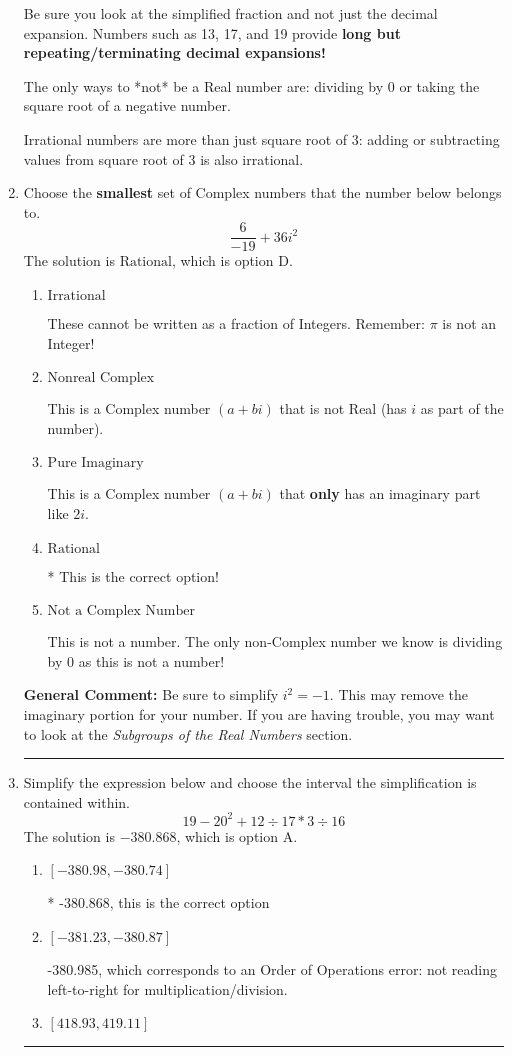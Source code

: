 \documentclass{extbook}[14pt]
\newcommand{\litem}[1]{\item #1

\rule{\textwidth}{0.4pt}}
\begin{document}
\begin{enumerate}
{ Be sure you look at the simplified fraction and not just the decimal expansion. Numbers such as 13, 17, and 19 provide \textbf{long but repeating/terminating decimal expansions!} 
 
 The only ways to *not* be a Real number are: dividing by 0 or taking the square root of a negative number. 
 
 Irrational numbers are more than just square root of 3: adding or subtracting values from square root of 3 is also irrational.
}
\litem{
Choose the \textbf{smallest} set of Complex numbers that the number below belongs to.
\[ \frac{6}{-19}+36i^2 \]The solution is \( \text{Rational} \), which is option D.\begin{enumerate}[label=\Alph*.]
\item \( \text{Irrational} \)

These cannot be written as a fraction of Integers. Remember: $\pi$ is not an Integer!
\item \( \text{Nonreal Complex} \)

This is a Complex number $(a+bi)$ that is not Real (has $i$ as part of the number).
\item \( \text{Pure Imaginary} \)

This is a Complex number $(a+bi)$ that \textbf{only} has an imaginary part like $2i$.
\item \( \text{Rational} \)

* This is the correct option!
\item \( \text{Not a Complex Number} \)

This is not a number. The only non-Complex number we know is dividing by 0 as this is not a number!
\end{enumerate}

\textbf{General Comment:} Be sure to simplify $i^2 = -1$. This may remove the imaginary portion for your number. If you are having trouble, you may want to look at the \textit{Subgroups of the Real Numbers} section.
}
\litem{
Simplify the expression below and choose the interval the simplification is contained within.
\[ 19 - 20^2 + 12 \div 17 * 3 \div 16 \]The solution is \( -380.868 \), which is option A.\begin{enumerate}[label=\Alph*.]
\item \( [-380.98, -380.74] \)

* -380.868, this is the correct option
\item \( [-381.23, -380.87] \)

 -380.985, which corresponds to an Order of Operations error: not reading left-to-right for multiplication/division.
\item \( [418.93, 419.11] \)


\end{enumerate}}
\end{enumerate}
\end{document}
